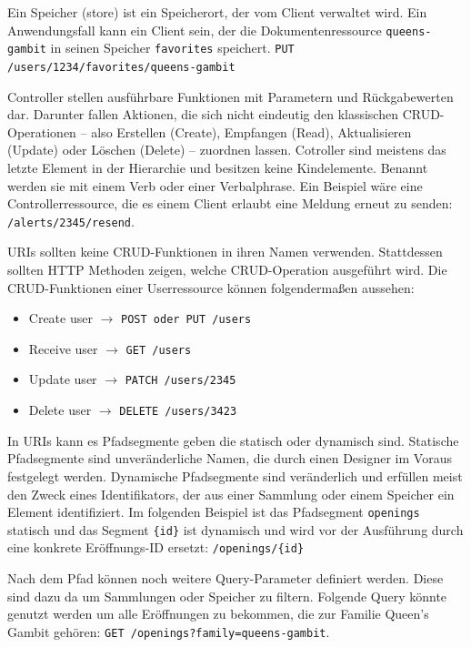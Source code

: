 Ein Speicher (store) ist ein Speicherort, der vom Client verwaltet wird. Ein Anwendungsfall kann ein Client sein, der die Dokumentenressource \lstinline{queens-gambit} in seinen Speicher \lstinline{favorites} speichert. \lstinline{PUT /users/1234/favorites/queens-gambit}

Controller stellen ausführbare Funktionen mit Parametern und Rückgabewerten dar.
Darunter fallen Aktionen, die sich nicht eindeutig den klassischen CRUD-Operationen – also Erstellen (Create), Empfangen (Read), Aktualisieren (Update) oder Löschen (Delete) – zuordnen lassen.
Cotroller sind meistens das letzte Element in der Hierarchie und besitzen keine Kindelemente. Benannt werden sie mit einem Verb oder einer Verbalphrase. Ein Beispiel wäre eine Controllerressource, die es einem Client erlaubt eine Meldung erneut zu senden: \lstinline{/alerts/2345/resend}.

\ac{URI}s sollten keine CRUD-Funktionen in ihren Namen verwenden. Stattdessen sollten HTTP Methoden zeigen, welche CRUD-Operation ausgeführt wird. Die CRUD-Funktionen einer Userressource können folgendermaßen aussehen:

\begin{itemize}
  \item Create user $\rightarrow$ \lstinline{POST oder PUT /users}
  \item Receive user $\rightarrow$ \lstinline{GET /users}
  \item Update user $\rightarrow$ \lstinline{PATCH /users/2345}
  \item Delete user $\rightarrow$ \lstinline{DELETE /users/3423}
\end{itemize}

In \ac{URI}s kann es Pfadsegmente geben die statisch oder dynamisch sind. Statische Pfadsegmente sind unveränderliche Namen, die durch einen Designer im Voraus festgelegt werden. Dynamische Pfadsegmente sind veränderlich und erfüllen meist den Zweck eines Identifikators, der aus einer Sammlung oder einem Speicher ein Element identifiziert. Im folgenden Beispiel ist das Pfadsegment \lstinline{openings} statisch und das Segment \lstinline|{id}| ist dynamisch und wird vor der Ausführung durch eine konkrete Eröffnungs-ID ersetzt: \lstinline|/openings/{id}|

Nach dem Pfad können noch weitere Query-Parameter definiert werden. Diese sind dazu da um Sammlungen oder Speicher zu filtern. Folgende Query könnte genutzt werden um alle Eröffnungen zu bekommen, die zur Familie Queen's Gambit gehören: \lstinline{GET /openings?family=queens-gambit}.


